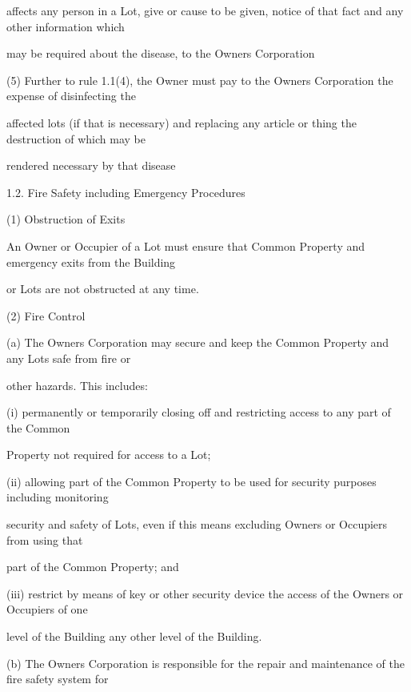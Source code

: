 \documentclass{article}
\begin{document}
{\fontsize{10.02}{1}affects any person in a Lot, give or cause to be given, notice of that fact and any other information which }

{\fontsize{10.02}{1}may be required about the disease, to the Owners Corporation }

{\fontsize{9.962}{1}(5) Further to rule 1.1(4), the Owner must pay to the Owners Corporation the expense of disinfecting the }

{\fontsize{10.02}{1}affected lots (if that is necessary) and replacing any article or thing the destruction of which may be }

{\fontsize{10.02}{1}rendered necessary by that disease }

{\fontsize{9.99}{1}1.2. Fire Safety including Emergency Procedures }

{\fontsize{9.962}{1}(1) Obstruction of Exits }

{\fontsize{10.02}{1}An Owner or Occupier of a Lot must ensure that Common Property and emergency exits from the Building }

{\fontsize{10.02}{1}or Lots are not obstructed at any time. }

{\fontsize{9.962}{1}(2) Fire Control }

{\fontsize{9.962}{1}(a) The Owners Corporation may secure and keep the Common Property and any Lots safe from fire or }

{\fontsize{10.02}{1}other hazards. This includes: }

{\fontsize{9.962}{1}(i) permanently or temporarily closing off and restricting access to any part of the Common }

{\fontsize{10.02}{1}Property not required for access to a Lot; }

{\fontsize{9.962}{1}(ii) allowing part of the Common Property to be used for security purposes including monitoring }

{\fontsize{10.02}{1}security and safety of Lots, even if this means excluding Owners or Occupiers from using that }

{\fontsize{10.02}{1}part of the Common Property; and }

{\fontsize{9.962}{1}(iii) restrict by means of key or other security device the access of the Owners or Occupiers of one }

{\fontsize{10.02}{1}level of the Building any other level of the Building. }

{\fontsize{9.962}{1}(b) The Owners Corporation is responsible for the repair and maintenance of the fire safety system for }
\end{document}
